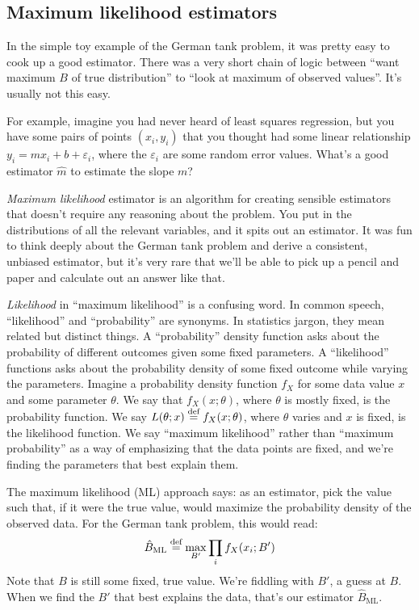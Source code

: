 \subsection{Maximum likelihood estimators}

In the simple toy example of the German tank problem, it was pretty easy to
cook up a good estimator. There was a very short chain of logic between ``want
maximum $B$ of true distribution'' to ``look at maximum of observed values''.
It's usually not this easy.

For example, imagine you had never heard of least squares regression, but you
have some pairs of points $(x_i, y_i)$ that you thought had some linear
relationship $y_i = m x_i + b + \varepsilon_i$, where the $\varepsilon_i$ are
some random error values. What's a good estimator $\hat{m}$ to estimate the
slope $m$?

\emph{Maximum likelihood} estimator is an algorithm for creating sensible
estimators that doesn't require any reasoning about the problem. You put in
the distributions of all the relevant variables, and it spits out an
estimator. It was fun to think deeply about the German tank problem and
derive a consistent, unbiased estimator, but it's very rare that we'll be
able to pick up a pencil and paper and calculate out an answer like that.

\emph{Likelihood} in ``maximum likelihood'' is a confusing word. In common
speech, ``likelihood'' and ``probability'' are synonyms. In statistics jargon,
they mean related but distinct things. A ``probability'' density function asks
about the probability of different outcomes given some fixed parameters. A
``likelihood'' functions asks about the probability density of some fixed
outcome while varying the parameters. Imagine a probability density function
$f_X$ for some data value $x$ and some parameter $\theta$. We say that $f_X(x;
\theta)$, where $\theta$ is mostly fixed, is the probability function. We say
$L(\theta; x) \stackrel{\text{def}}{=} f_X(x; \theta)$, where $\theta$ varies and $x$ is fixed,
is the likelihood function. We say ``maximum likelihood'' rather than
``maximum probability'' as a way of emphasizing that the data points are
fixed, and we're finding the parameters that best explain them.

The maximum likelihood (ML) approach says: as an estimator, pick the value
such that, if it were the true value, would maximize the probability density
of the observed data. For the German tank problem, this would read:
\begin{equation}
\hat{B}_\text{ML} \stackrel{\text{def}}{=} \max_{B'} \prod_i f_X(x_i; B')
\end{equation}
Note that $B$ is still some fixed, true value. We're fiddling with $B'$, a
guess at $B$. When we find the $B'$ that best explains the data, that's our
estimator $\hat{B}_\mathrm{ML}$.

